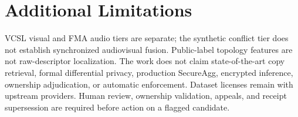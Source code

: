 \documentclass[journal]{IEEEtran}
\begin{document}
\section{Additional Limitations}

VCSL visual and FMA audio tiers are separate; the synthetic conflict tier does not establish synchronized audiovisual fusion. Public-label topology features are not raw-descriptor localization. The work does not claim state-of-the-art copy retrieval, formal differential privacy, production SecureAgg, encrypted inference, ownership adjudication, or automatic enforcement. Dataset licenses remain with upstream providers. Human review, ownership validation, appeals, and receipt supersession are required before action on a flagged candidate.
\end{document}
